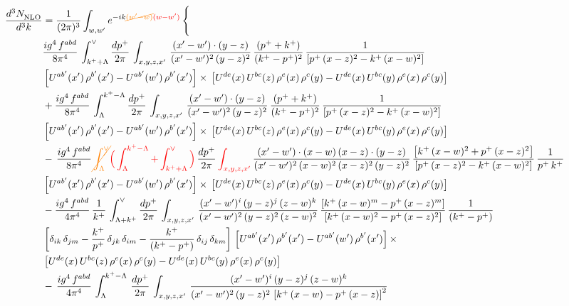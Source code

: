 \documentclass[9pt]{article}
\numberwithin{equation}{section}
\begin{document}
\begin{align}
    \frac{d^{3}N_{\rm NLO}^{\rm}}{d^{3}k}  & = \frac{1}{(2\pi)^{3}}  \int_{w, w^\prime} e^{-ik{\color{orange}\cancel{(w^\prime-w)}}{\color{red}(w-w^\prime)}}\, \Bigg\{\notag \\ &  \frac{ig^{4}\,f^{abd}}{8\pi^{4}}\,\int_{k^{+}+\Lambda}^{\vee}\frac{dp^{+}}{2\pi}\, \int_{x,y,z,x'}\, \frac{(x'-w')\cdot (y-z)}{(x'-w')^{2}\,(y-z)^{2}}\, \frac{(p^{+}+k^{+})}{(k^{+}-p^{+})^{2}}\, \frac{1}{\left[p^{+}\,(x-z)^{2}-k^{+}\,(x-w)^{2}\right]}\notag \\ & \left[U^{ab'}(x')\,\rho^{b'}(x')-U^{ab'}(w')\, \rho^{b'}(x')\right]\times\, \left[U^{de}(x)\,U^{bc}(z)\, \rho^{e}(x)\,\rho^{c}(y)-U^{de}(x)\,U^{bc}(y)\,\rho^{e}(x)\,\rho^{c}(y)\right]\notag \\ & + \frac{ig^{4}\,f^{abd}}{8\pi^{4}}\,\int_{\Lambda}^{k^{+}-\Lambda}\frac{dp^{+}}{2\pi}\, \int_{x,y,z,x'}\, \frac{(x'-w')\cdot (y-z)}{(x'-w')^{2}\,(y-z)^{2}}\, \frac{(p^{+}+k^{+})}{(k^{+}-p^{+})^{2}}\, \frac{1}{\left[p^{+}\,(x-z)^{2}-k^{+}\,(x-w)^{2}\right]}\notag \\ & \left[U^{ab'}(x')\,\rho^{b'}(x')-U^{ab'}(w')\, \rho^{b'}(x')\right]\times\, \left[U^{de}(x)\,U^{bc}(z)\, \rho^{e}(x)\,\rho^{c}(y)-U^{de}(x)\,U^{bc}(y)\,\rho^{e}(x)\,\rho^{c}(y)\right]\notag \\ & -\, \frac{ig^{4}\,f^{abd}}{8\pi^{4}}\, {\color{orange}\cancel{\int_{\Lambda}^{\vee}}}{\color{red}\Big(\int_{\Lambda}^{k^{+}-\Lambda}+\int_{k^{+}+\Lambda}^{\vee}\Big)}\, \frac{dp^{+}}{2\pi}\, {\color{red}\int_{x,y,z,x'}}\,\frac{(x'-w')\cdot (x-w)\, (x-z)\cdot (y-z)}{(x'-w')^{2}\, (x-w)^{2}\, (x-z)^{2}\, (y-z)^{2}}\, \frac{\left[k^{+}\,(x-w)^{2}+p^{+}\,(x-z)^{2}\right]}{\left[p^{+}\,(x-z)^{2}-k^{+}\,(x-w)^{2}\right]}\, \frac{1}{p^{+}\,k^{+}} \notag \\ & \left[U^{ab'}(x')\,\rho^{b'}(x')-U^{ab'}(w')\, \rho^{b'}(x')\right]\times\, \left[U^{de}(x)\,U^{bc}(z)\, \rho^{e}(x)\,\rho^{c}(y)-U^{de}(x)\,U^{bc}(y)\,\rho^{e}(x)\,\rho^{c}(y)\right]\notag \\ & -\frac{ig^{4}\, f^{abd}}{4\pi^{4}}\, \frac{1}{k^{+}}\,\int_{\Lambda + k^{+}}^{\vee}\frac{dp^{+}}{2\pi}\, \int_{x,y,z,x'}\,\frac{(x'-w')^{i}\, (y-z)^{j}\, (z-w)^{k}}{(x'-w')^{2}\, (y-z)^{2}\, (z-w)^{2}}\, \frac{\left[k^{+}\,(x-w)^{m}-p^{+}\,(x-z)^{m}\right]}{\left[k^{+}\,(x-w)^{2}-p^{+}\,(x-z)^{2}\right]}\,\frac{1}{(k^{+}-p^{+})}\notag \\ & \left[\delta_{ik}\, \delta_{jm} - \frac{k^{+}}{p^{+}}\, \delta_{jk}\, \delta_{im}-\frac{k^{+}}{(k^{+}-p^{+})}\, \delta_{ij}\,\delta_{km}\right]\, \left[U^{ab'}(x')\,\rho^{b'}(x')-U^{ab'}(w')\, \rho^{b'}(x')\right]\times\notag \\ & \left[U^{de}(x)\,U^{bc}(z)\, \rho^{e}(x)\,\rho^{c}(y)-U^{de}(x)\,U^{bc}(y)\,\rho^{e}(x)\,\rho^{c}(y)\right]\notag \\ & -\,\frac{ig^{4}\, f^{abd}}{4\pi^{4}}\, \int_{\Lambda}^{k^{+}-\Lambda}\,\frac{dp^{+}}{2\pi}\, \int_{x,y,z,x'}\,\frac{(x'-w')^{i}\, (y-z)^{j}\, (z-w)^{k}}{(x'-w')^{2}\, (y-z)^{2}\,\left[k^{+}\,(x-w)-p^{+}\,(x-z)\right]^{2}}\, 
\end{align}
\end{document}
